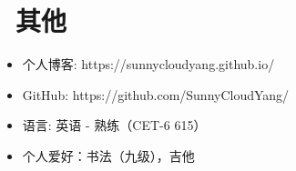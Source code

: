 \documentclass{resume}
\begin{document}
\section{\faInfo\ 其他}
\begin{itemize}[parsep=0.5ex]
  \item 个人博客: https://sunnycloudyang.github.io/
  \item GitHub: https://github.com/SunnyCloudYang/
  \item 语言: 英语 - 熟练（CET-6 615）
  \item 个人爱好：书法（九级），吉他
\end{itemize}

%
%
\end{document}
